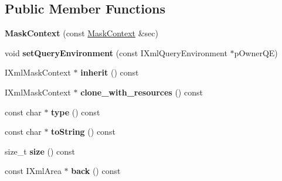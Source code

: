 \subsection*{\-Public \-Member \-Functions}
\begin{DoxyCompactItemize}
\item 
\hypertarget{classgeneral__server_1_1MaskContext_a3a91ab66fb5b5b311ba3faf4f221014b}{{\bfseries \-Mask\-Context} (const \hyperlink{classgeneral__server_1_1MaskContext}{\-Mask\-Context} \&sec)}\label{classgeneral__server_1_1MaskContext_a3a91ab66fb5b5b311ba3faf4f221014b}

\item 
\hypertarget{classgeneral__server_1_1MaskContext_aa457559d75e73b54133b4f305e411b79}{void {\bfseries set\-Query\-Environment} (const \-I\-Xml\-Query\-Environment $\ast$p\-Owner\-Q\-E)}\label{classgeneral__server_1_1MaskContext_aa457559d75e73b54133b4f305e411b79}

\item 
\hypertarget{classgeneral__server_1_1MaskContext_ab65a36dd814cc9760f38a96eeb98f3ac}{\-I\-Xml\-Mask\-Context $\ast$ {\bfseries inherit} () const }\label{classgeneral__server_1_1MaskContext_ab65a36dd814cc9760f38a96eeb98f3ac}

\item 
\hypertarget{classgeneral__server_1_1MaskContext_ad9ed29925c272f456c0b818d0567b893}{\-I\-Xml\-Mask\-Context $\ast$ {\bfseries clone\-\_\-with\-\_\-resources} () const }\label{classgeneral__server_1_1MaskContext_ad9ed29925c272f456c0b818d0567b893}

\item 
\hypertarget{classgeneral__server_1_1MaskContext_a5e8e81e048c0b32209fd828c6322e263}{const char $\ast$ {\bfseries type} () const }\label{classgeneral__server_1_1MaskContext_a5e8e81e048c0b32209fd828c6322e263}

\item 
\hypertarget{classgeneral__server_1_1MaskContext_a33917e7f5f29def9ced4a356775a2f50}{const char $\ast$ {\bfseries to\-String} () const }\label{classgeneral__server_1_1MaskContext_a33917e7f5f29def9ced4a356775a2f50}

\item 
\hypertarget{classgeneral__server_1_1MaskContext_ad2f4704d6fd016cef6deeb75ca013645}{size\-\_\-t {\bfseries size} () const }\label{classgeneral__server_1_1MaskContext_ad2f4704d6fd016cef6deeb75ca013645}

\item 
\hypertarget{classgeneral__server_1_1MaskContext_af6c1a34a3ef393c8771ccd7ebff6e97f}{const \-I\-Xml\-Area $\ast$ {\bfseries back} () const }\label{classgeneral__server_1_1MaskContext_af6c1a34a3ef393c8771ccd7ebff6e97f}


\end{DoxyCompactItemize}
